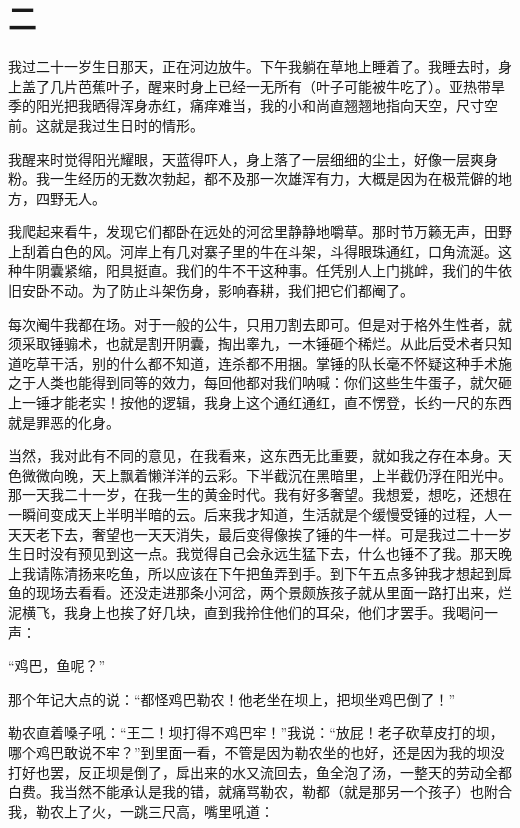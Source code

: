  

\section{二} 
 
我过二十一岁生日那天，正在河边放牛。下午我躺在草地上睡着了。我睡去时，身上盖了几片芭蕉叶子，醒来时身上已经一无所有（叶子可能被牛吃了）。亚热带旱季的阳光把我晒得浑身赤红，痛痒难当，我的小和尚直翘翘地指向天空，尺寸空前。这就是我过生日时的情形。 
 
 我醒来时觉得阳光耀眼，天蓝得吓人，身上落了一层细细的尘土，好像一层爽身粉。我一生经历的无数次勃起，都不及那一次雄浑有力，大概是因为在极荒僻的地方，四野无人。 
 
 我爬起来看牛，发现它们都卧在远处的河岔里静静地嚼草。那时节万籁无声，田野上刮着白色的风。河岸上有几对寨子里的牛在斗架，斗得眼珠通红，口角流涎。这种牛阴囊紧缩，阳具挺直。我们的牛不干这种事。任凭别人上门挑衅，我们的牛依旧安卧不动。为了防止斗架伤身，影响春耕，我们把它们都阉了。 
 
 每次阉牛我都在场。对于一般的公牛，只用刀割去即可。但是对于格外生性者，就须采取锤骟术，也就是割开阴囊，掏出睾九，一木锤砸个稀烂。从此后受术者只知道吃草干活，别的什么都不知道，连杀都不用捆。掌锤的队长毫不怀疑这种手术施之于人类也能得到同等的效力，每回他都对我们呐喊：你们这些生牛蛋子，就欠砸上一锤才能老实！按他的逻辑，我身上这个通红通红，直不愣登，长约一尺的东西就是罪恶的化身。 
 
 当然，我对此有不同的意见，在我看来，这东西无比重要，就如我之存在本身。天色微微向晚，天上飘着懒洋洋的云彩。下半截沉在黑暗里，上半截仍浮在阳光中。那一天我二十一岁，在我一生的黄金时代。我有好多奢望。我想爱，想吃，还想在一瞬间变成天上半明半暗的云。后来我才知道，生活就是个缓慢受锤的过程，人一天天老下去，奢望也一天天消失，最后变得像挨了锤的牛一样。可是我过二十一岁生日时没有预见到这一点。我觉得自己会永远生猛下去，什么也锤不了我。那天晚上我请陈清扬来吃鱼，所以应该在下午把鱼弄到手。到下午五点多钟我才想起到戽鱼的现场去看看。还没走进那条小河岔，两个景颇族孩子就从里面一路打出来，烂泥横飞，我身上也挨了好几块，直到我拎住他们的耳朵，他们才罢手。我喝问一声： 
 
 “鸡巴，鱼呢？” 
 
 那个年记大点的说：“都怪鸡巴勒农！他老坐在坝上，把坝坐鸡巴倒了！” 
 
 勒农直着嗓子吼：“王二！坝打得不鸡巴牢！”我说：“放屁！老子砍草皮打的坝，哪个鸡巴敢说不牢？”到里面一看，不管是因为勒农坐的也好，还是因为我的坝没打好也罢，反正坝是倒了，戽出来的水又流回去，鱼全泡了汤，一整天的劳动全都白费。我当然不能承认是我的错，就痛骂勒农，勒都（就是那另一个孩子）也附合我，勒农上了火，一跳三尺高，嘴里吼道： 
 
